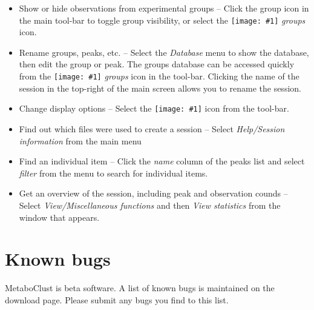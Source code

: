 \documentclass[11pt,a4paper]{article}
\newcommand{\menu}[1]{ \flqq\textit{#1}\frqq}
\newcommand{\icon}[1]{\texttt{[image: \#1]}}
\begin{document}
\begin{itemize}
	\item Show or hide observations from experimental groups -- Click the group icon in the main tool-bar to toggle group visibility, or select the \icon{groups} \menu{groups} icon.
	\item Rename groups, peaks, etc. -- Select the \menu{Database} menu to show the database, then edit the group or peak. The groups database can be accessed quickly from the \icon{groups} \menu{groups} icon in the tool-bar. Clicking the name of the session in the top-right of the main screen allows you to rename the session.
	\item Change display options -- Select the \icon{prefs} icon from the tool-bar.
	\item Find out which files were used to create a session -- Select \menu{Help/Session information} from the main menu
	\item Find an individual item -- Click the \menu{name} column of the peaks list and select \menu{filter} from the menu to search for individual items.
	\item Get an overview of the session, including peak and observation counds -- Select \menu{View/Miscellaneous functions} and then \menu{View statistics} from the window that appears.
\end{itemize}

\section{Known bugs}
MetaboClust is beta software. A list of known bugs is maintained on the download page. Please submit any bugs you find to this list.
\end{document}
